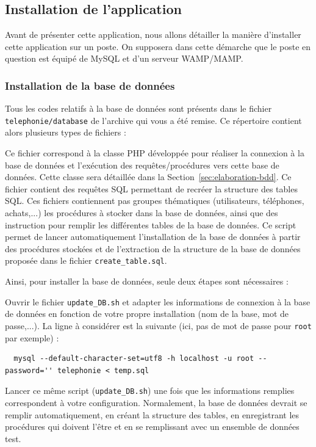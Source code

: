 \subsection{Installation de l'application}
Avant de présenter cette application, nous allons détailler la manière d'installer cette application sur un poste. On supposera dans cette démarche que le poste en question est équipé de MySQL et d'un serveur WAMP/MAMP.

\subsubsection{Installation de la base de données}
Tous les codes relatifs à la base de données sont présents dans le fichier \texttt{telephonie/database} de l'archive qui vous a été remise. Ce répertoire contient alors plusieurs types de fichiers :
\begin{itemize}
  Ce fichier correspond à la classe PHP développée pour réaliser la connexion à la base de données et l'exécution des requêtes/procédures vers cette base de données. Cette classe sera détaillée dans la Section~\ref{sec:elaboration-bdd}.
  Ce fichier contient des requêtes SQL permettant de recréer la structure des tables SQL.
  Ces fichiers contiennent pas groupes thématiques (utilisateurs, téléphones, achats,...) les procédures à stocker dans la base de données, ainsi que des instruction pour remplir les différentes tables de la base de données.
  Ce script permet de lancer \og automatiquement\fg{} l'installation de la base de données à partir des procédures stockées et de l'extraction de la structure de la base de données proposée dans le fichier \texttt{create\_table.sql}.
\end{itemize}

Ainsi, pour installer la base de données, seule deux étapes sont nécessaires :
\begin{itemize}
  Ouvrir le fichier \texttt{update\_DB.sh} et adapter les informations de connexion à la base de données en fonction de votre propre installation (nom de la base, mot de passe,...). La ligne à considérer est la suivante (ici, pas de mot de passe pour \texttt{root} par exemple) :
\begin{lstlisting}
  mysql --default-character-set=utf8 -h localhost -u root --password='' telephonie < temp.sql
\end{lstlisting}
  Lancer ce même script (\texttt{update\_DB.sh}) une fois que les informations remplies correspondent à votre configuration. Normalement, la base de données devrait se remplir automatiquement, en créant la structure des tables, en enregistrant les procédures qui doivent l'être et en se remplissant avec un ensemble de données test.
\end{itemize}

